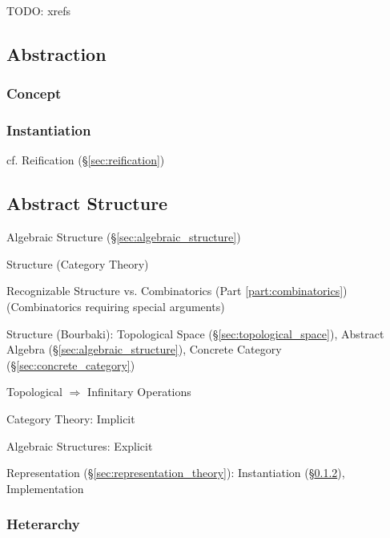 TODO: xrefs



\subsection{Abstraction}\label{sec:abstraction}

\subsubsection{Concept}\label{sec:concept}

\subsubsection{Instantiation}\label{sec:instantiation}

\fist cf. Reification (\S\ref{sec:reification})



\subsection{Abstract Structure}\label{sec:abstract_structure}


Algebraic Structure (\S\ref{sec:algebraic_structure})

Structure (Category Theory) %

Recognizable Structure vs. Combinatorics (Part
\ref{part:combinatorics}) (Combinatorics requiring special arguments)

Structure (Bourbaki): Topological Space
(\S\ref{sec:topological_space}), Abstract Algebra
(\S\ref{sec:algebraic_structure}), Concrete Category
(\S\ref{sec:concrete_category})

Topological $\Rightarrow$ Infinitary Operations

Category Theory: Implicit

Algebraic Structures: Explicit

Representation (\S\ref{sec:representation_theory}): Instantiation
(\S\ref{sec:instantiation}), Implementation



\subsubsection{Heterarchy}\label{sec:heterarchy}

